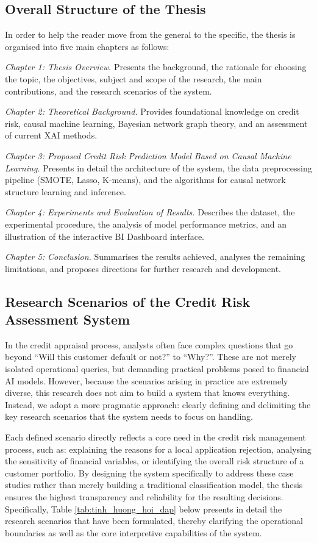 \subsection{Overall Structure of the Thesis}
\noindent
In order to help the reader move from the general to the specific, the thesis is organised into five main chapters as follows:

\textit{Chapter 1: Thesis Overview}. Presents the background, the rationale for choosing the topic, the objectives, subject and scope of the research, the main contributions, and the research scenarios of the system.

\textit{Chapter 2: Theoretical Background.} Provides foundational knowledge on credit risk, causal machine learning, Bayesian network graph theory, and an assessment of current XAI methods.

\textit{Chapter 3: Proposed Credit Risk Prediction Model Based on Causal Machine Learning.} Presents in detail the architecture of the system, the data preprocessing pipeline (SMOTE, Lasso, K-means), and the algorithms for causal network structure learning and inference.

\textit{Chapter 4: Experiments and Evaluation of Results.} Describes the dataset, the experimental procedure, the analysis of model performance metrics, and an illustration of the interactive BI Dashboard interface.

\textit{Chapter 5: Conclusion.} Summarises the results achieved, analyses the remaining limitations, and proposes directions for further research and development.

\subsection{Research Scenarios of the Credit Risk Assessment System}
\noindent
In the credit appraisal process, analysts often face complex questions that go beyond ``Will this customer default or not?'' to ``Why?''. These are not merely isolated operational queries, but demanding practical problems posed to financial AI models. However, because the scenarios arising in practice are extremely diverse, this research does not aim to build a system that knows everything. Instead, we adopt a more pragmatic approach: clearly defining and delimiting the key research scenarios that the system needs to focus on handling.

Each defined scenario directly reflects a core need in the credit risk management process, such as: explaining the reasons for a local application rejection, analysing the sensitivity of financial variables, or identifying the overall risk structure of a customer portfolio. By designing the system specifically to address these case studies rather than merely building a traditional classification model, the thesis ensures the highest transparency and reliability for the resulting decisions. Specifically, Table \ref{tab:tinh_huong_hoi_dap} below presents in detail the research scenarios that have been formulated, thereby clarifying the operational boundaries as well as the core interpretive capabilities of the system.

